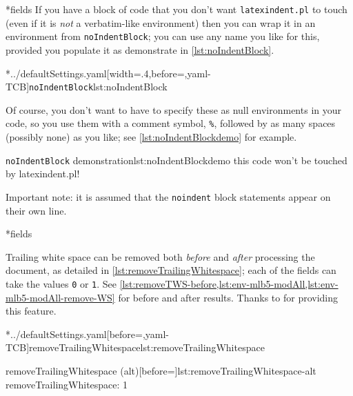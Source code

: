 *{fields}
	If you have a block of code that you don't want \texttt{latexindent.pl} to touch (even if
	 it is \emph{not} a verbatim-like environment) then
	you can wrap it in an environment from \texttt{noIndentBlock}; you can use any name you
	like for this, provided you populate it as demonstrate in \cref{lst:noIndentBlock}.

	\cmhlistingsfromfile[style=noIndentBlock]*{../defaultSettings.yaml}[width=.4\linewidth,before=\centering,yaml-TCB]{\texttt{noIndentBlock}}{lst:noIndentBlock}

	Of course, you don't want to have to specify these as null environments in your code, so
	you use them with a comment symbol, \lstinline!%!, followed by as many spaces
	(possibly none) as you like; see \cref{lst:noIndentBlockdemo} for example.

	\begin{cmhlistings}[style=demo,escapeinside={(*@}{@*)}]{\texttt{noIndentBlock} demonstration}{lst:noIndentBlockdemo}
        this code
                won't
     be touched
                    by
             latexindent.pl!
	\end{cmhlistings}

    Important note: it is assumed that the \texttt{noindent} block statements appear on their own line.

*{fields}\label{yaml:removeTrailingWhitespace}

	Trailing white space can be removed both \emph{before} and
	\emph{after} processing the document, as detailed in \cref{lst:removeTrailingWhitespace};
	each of the fields can take the values \texttt{0} or
	\texttt{1}. See \vref{lst:removeTWS-before,lst:env-mlb5-modAll,lst:env-mlb5-modAll-remove-WS} for before and after results. Thanks
	to \cite{vosskuhle} for providing this feature.

	\begin{minipage}{.4\textwidth}
		\cmhlistingsfromfile[style=removeTrailingWhitespace]*{../defaultSettings.yaml}[before=\centering,yaml-TCB]{removeTrailingWhitespace}{lst:removeTrailingWhitespace}
	\end{minipage}%
	\hfill
	\begin{minipage}{.5\textwidth}
		\begin{yaml}[numbers=none]{removeTrailingWhitespace (alt)}[before=\centering]{lst:removeTrailingWhitespace-alt}
removeTrailingWhitespace: 1
\end{yaml}
	\end{minipage}%

